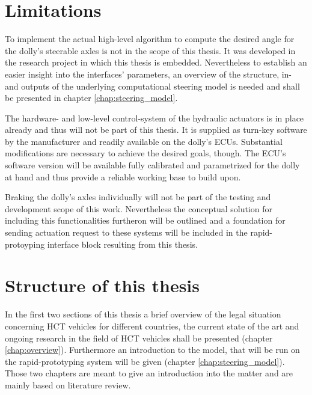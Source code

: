 \documentclass[ExampleMasters.tex]{subfiles}
\begin{document}
\section{Limitations}
\label{sec:limitations}
To implement the actual high-level algorithm to compute the desired angle for the dolly's steerable axles is not in the scope of this thesis. It was developed in the research project in which this thesis is embedded. Nevertheless to establish an easier insight into the interfaces' parameters, an overview of the structure, in- and outputs of the underlying computational steering model is needed and shall be presented in chapter \ref{chap:steering_model}. 

The hardware- and low-level control-system of the hydraulic actuators is in place already and thus will not be part of this thesis. It is supplied as turn-key software by the manufacturer and readily available on the dolly's \gls{ECU}s. Substantial modifications are necessary to achieve the desired goals, though. The \gls{ECU}'s software version will be available fully calibrated and parametrized for the dolly at hand and thus provide a reliable working base to build upon. 

Braking the dolly's axles individually will not be part of the testing and development scope of this work. Nevertheless the conceptual solution for including this functionalities furtheron will be outlined and a foundation for sending actuation request to these systems will be included in the rapid-protoyping interface block resulting from this thesis. 


\section{Structure of this thesis}
\label{sec:structure}

In the first two sections of this thesis a brief overview of the legal situation concerning \gls{HCT} vehicles for different countries, the current state of the art and ongoing research in the field of \gls{HCT} vehicles shall be presented (chapter \ref{chap:overview}). Furthermore an introduction to the model, that will be run on the rapid-prototyping system will be given (chapter \ref{chap:steering_model}). Those two chapters are meant to give an introduction into the matter and are mainly based on literature review. 
\end{document}
